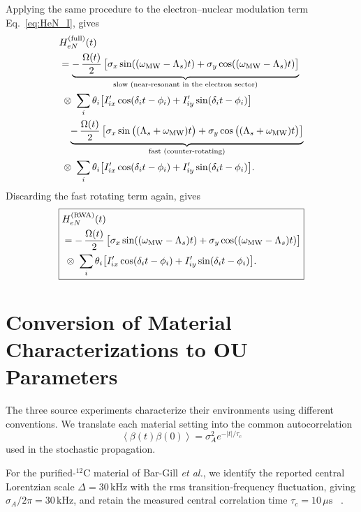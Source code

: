\documentclass[
  aps,
  pra,
  reprint,            %
  superscriptaddress, %
  amsmath,amssymb,
  notitlepage
]{revtex4-2}
\begin{document}
Applying the same procedure to the electron–nuclear modulation term Eq.~\eqref{eq:HeN_I}, gives
\begin{align}
&\notag H_{eN}^{(\mathrm{full})}(t)\\
&\notag=
\underbrace{-\,\frac{\Omega(t)}{2}\,
\big[\sigma_x\sin((\omega_{\mathrm{MW}}-\Lambda_s) t)+\sigma_y\cos((\omega_{\mathrm{MW}}-\Lambda_s) t)\big]}_{\text{slow (near-resonant in the electron sector)}}\;\\
&\notag\;\otimes\;
\sum_i \theta_i\big[I'_{ix}\cos(\delta_i t-\phi_i)+I'_{iy}\sin(\delta_i t-\phi_i)\big]\\
&\notag\hspace{-0.0cm}\quad
\underbrace{-\,\frac{\Omega(t)}{2}\,
\big[\sigma_x\sin\big((\Lambda_s+\omega_{\mathrm{MW}})t\big)
      +\sigma_y\cos\big((\Lambda_s+\omega_{\mathrm{MW}})t\big)\big]}_{\text{fast (counter-rotating)}}\\
&\;\otimes\;
\sum_i \theta_i\big[I'_{ix}\cos(\delta_i t-\phi_i)+I'_{iy}\sin(\delta_i t-\phi_i)\big].
\label{eq:HeN_full_split}
\end{align}
Discarding the fast rotating term again, gives 
\begin{equation}
\boxed{
\begin{aligned}
&H_{eN}^{(\mathrm{RWA})}(t)\\
&\notag=-\,\frac{\Omega(t)}{2}\,
\big[\sigma_x\sin((\omega_{\mathrm{MW}}-\Lambda_s) t)+\sigma_y\cos((\omega_{\mathrm{MW}}-\Lambda_s) t)\big]\\
&\;\otimes\;
\sum_i \theta_i\big[I'_{ix}\cos(\delta_i t-\phi_i)+I'_{iy}\sin(\delta_i t-\phi_i)\big].
\end{aligned}
}
\label{eq:HeN_RWA_time_nophase_final}
\end{equation}

\section{Conversion of Material Characterizations to OU Parameters}
\label{app:material_parameter_conversion}

The three source experiments characterize their environments using
different conventions. We translate each material setting into the
common autocorrelation
\begin{equation}
\left\langle\beta(t)\beta(0)\right\rangle
=
\sigma_A^2e^{-|t|/\tau_c}
\end{equation}
used in the stochastic propagation.

For the purified-$^{12}\mathrm C$ material of Bar-Gill
\emph{et al.}, we identify the reported central Lorentzian scale
$\Delta=30\,\mathrm{kHz}$ with the rms transition-frequency
fluctuation, giving $\sigma_A/2\pi=30\,\mathrm{kHz}$, and retain the
measured central correlation time $\tau_c=10\,\mu\mathrm{s}$
~\cite{bargill2012spectroscopy}.
\end{document}

